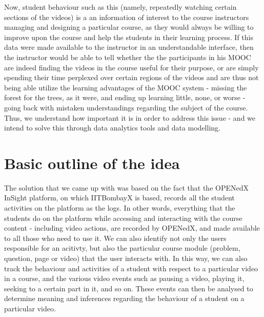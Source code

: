 \documentclass[16pt]{report}
\begin{document}
Now, student behaviour such as this (namely, repeatedly watching certain sections of the videos) is a an information of interest to the course instructors managing and designing a particular course, as they would always be willing to improve upon the course and help the students in their learning process. If this data were made available to the instructor in an understandable interface, then the instructor would be able to tell whether the the participants in his MOOC are indeed finding the videos in the course useful for their purpose, or are simply spending their time perplexed over certain regions of the videos and are thus not being able utilize the learning advantages of the MOOC system - missing the forest for the trees, as it were, and ending up learning little, none, or worse - going back with mistaken understandings regarding the subject of the course. Thus, we understand how important it is in order to address this issue - and we intend to solve this through data analytics tools and data modelling.


\section{Basic outline of the idea}

The solution that we came up with was based on the fact that the OPENedX InSight platform, on which IITBombayX is based, records all the student activities on the platform as the logs. In other words, everything that the students do on the platform while accessing and interacting with the course content - including video actions, are recorded by OPENedX, and made available to all those who need to use it. We can also identify not only the users responsible for an acitivty, but also the particular course module (problem, question, page or video) that the user interacts with. In this way, we can also track the behaviour and activities of a student with respect to a particular video in a course, and the various video events such as pausing a video, playing it, seeking to a certain part in it, and so on. These events can then be analysed to determine meaning and inferences regarding the behaviour of a student on a particular video.\\
\end{document}
